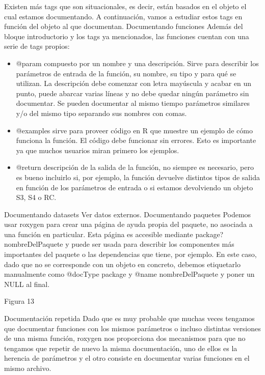 Existen m\'as tags que son situacionales, es decir, est\'an basados en el objeto el cual estamos
documentando. A continuaci\'on, vamos a estudiar estos tags en funci\'on del objeto al que
documentan.
Documentando funciones
Adem\'as del bloque introductorio y los tags ya mencionados, las funciones cuentan con una
serie de tags propios:
\begin{itemize}
    \item @param compuesto por un nombre y una descripci\'on. Sirve para describir los
par\'ametros de entrada de la funci\'on, su nombre, su tipo y para qu\'e se utilizan.
La descripci\'on debe comenzar con letra may\'uscula y acabar en un punto, puede
abarcar varias l\'ineas y no debe quedar ning\'un par\'ametro sin documentar.
Se pueden documentar al mismo tiempo par\'ametros similares y/o del mismo tipo
separando sus nombres con comas.
    \item @examples sirve para proveer c\'odigo en R que muestre un ejemplo de c\'omo funciona
la funci\'on. El c\'odigo debe funcionar sin errores. Esto es importante ya que muchos
usuarios miran primero los ejemplos.
    \item @return descripci\'on de la salida de la funci\'on, no siempre es necesario, pero es
bueno incluirlo si, por ejemplo, la funci\'on devuelve distintos tipos de salida en funci\'on
de los par\'ametros de entrada o si estamos devolviendo un objeto S3, S4 o RC.
\end{itemize}

Documentando datasets
Ver datos externos.
Documentando paquetes
Podemos usar roxygen para crear una p\'agina de ayuda propia del paquete, no asociada a
una funci\'on en particular. Esta p\'agina es accesible mediante package?nombreDelPaquete y
puede ser usada para describir los componentes m\'as importantes del paquete o las
dependencias que tiene, por ejemplo.
En este caso, dado que no se corresponde con un objeto en concreto, debemos etiquetarlo
manualmente como @docType package y @name nombreDelPaquete y poner un NULL al
final.

Figura 13

Documentaci\'on repetida
Dado que es muy probable que muchas veces tengamos que documentar funciones con los
mismos par\'ametros o incluso distintas versiones de una misma funci\'on, roxygen nos
proporciona dos mecanismos para que no tengamos que repetir de nuevo la misma
documentaci\'on, uno de ellos es la herencia de par\'ametros y el otro consiste en documentar
varias funciones en el mismo archivo.

